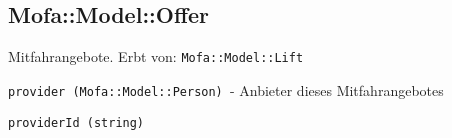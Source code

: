 \subsection*{Mofa::Model::Offer\label{Mofa::Model::Offer}}


Mitfahrangebote. Erbt von: \texttt{Mofa::Model::Lift}



\texttt{provider (Mofa::Model::Person) }- Anbieter dieses Mitfahrangebotes



\texttt{providerId (string)}

